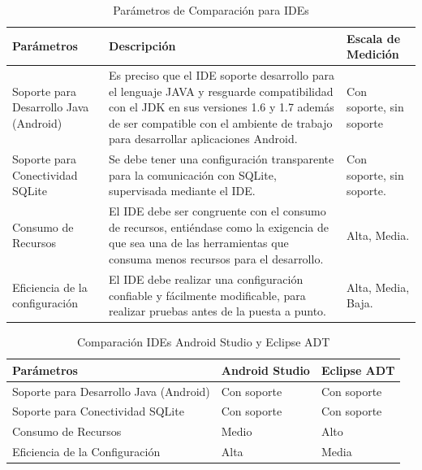 \begin{table}[h]
	\begin{center}
		\begin{tabular}{|p{4.2cm}|p{4.5cm}|p{4.5cm}|}
			\hline \rowcolor[RGB]{51,153,255} 
			\textcolor{blanco}{\bf Parámetros} &
				\textcolor{blanco}{\bf Descripción} &
				\textcolor{blanco}{\bf Escala de Medición} \\
			\hline 
				Soporte para Desarrollo Java (Android) &
				Es preciso que el IDE soporte desarrollo para el lenguaje JAVA y resguarde compatibilidad con el JDK en sus versiones 1.6 y 1.7 además de ser compatible con el ambiente de trabajo para desarrollar aplicaciones Android. &
				Con soporte, sin soporte \\
      		\hline \rowcolor[RGB]{240,248,255}
      			Soporte para Conectividad SQLite &
				Se debe tener una configuración transparente para la comunicación con SQLite, supervisada mediante el IDE. &
				Con soporte, sin soporte. \\
      		\hline 
      			Consumo de Recursos &
				El IDE debe ser congruente con el consumo de recursos, entiéndase como la exigencia de que sea una de las herramientas que consuma menos recursos para el desarrollo. &
				Alta, Media. \\
      		\hline \rowcolor[RGB]{240,248,255}
      			Eficiencia de la configuración  &
				El IDE debe realizar una configuración confiable y fácilmente modificable, para realizar pruebas antes de la puesta a punto. &
				Alta, Media, Baja. \\
      		\hline 
    		\end{tabular}
	\end{center}
	\caption[Parámetros de Comparación para IDEs]{Parámetros de Comparación para IDEs} 
	\label{tab:paramIDEs}
\end{table}

\begin{table}[h]
	\begin{center}
		\begin{tabular}{|p{3cm}|p{3cm}|p{3cm}|}
			\hline \rowcolor[RGB]{51,153,255} 
			\textcolor{blanco}{\bf Parámetros} &
				\textcolor{blanco}{\bf Android Studio} &
				\textcolor{blanco}{\bf Eclipse ADT} \\
			\hline 
				Soporte para Desarrollo Java (Android) &
				Con soporte &
				Con soporte \\
      		\hline \rowcolor[RGB]{240,248,255}
      			Soporte para Conectividad SQLite &
				Con soporte &
				Con soporte \\
      		\hline 
      			Consumo de Recursos &
				Medio &
				Alto \\
      		\hline \rowcolor[RGB]{240,248,255}
      			Eficiencia de la Configuración &
				Alta &
				Media \\
      		\hline 
    		\end{tabular}
	\end{center}
	\caption[Comparación IDEs Android Studio y Eclipse ADT]{Comparación IDEs Android Studio y Eclipse ADT} 
	\label{tab:comIDEs}
\end{table}

